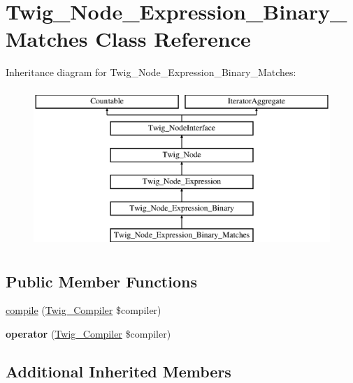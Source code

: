 \hypertarget{class_twig___node___expression___binary___matches}{}\section{Twig\+\_\+\+Node\+\_\+\+Expression\+\_\+\+Binary\+\_\+\+Matches Class Reference}
\label{class_twig___node___expression___binary___matches}
Inheritance diagram for Twig\+\_\+\+Node\+\_\+\+Expression\+\_\+\+Binary\+\_\+\+Matches\+:\begin{figure}[H]
\begin{center}
\leavevmode
\includegraphics[height=6.000000cm]{class_twig___node___expression___binary___matches}
\end{center}
\end{figure}
\subsection*{Public Member Functions}
\begin{DoxyCompactItemize}
\item 
\hyperlink{class_twig___node___expression___binary___matches_a4e0faa87c3fae583620b84d3607085da}{compile} (\hyperlink{class_twig___compiler}{Twig\+\_\+\+Compiler} \$compiler)
\item 
\hypertarget{class_twig___node___expression___binary___matches_af77318ec88d5f8a508684970a150b670}{}{\bfseries operator} (\hyperlink{class_twig___compiler}{Twig\+\_\+\+Compiler} \$compiler)\label{class_twig___node___expression___binary___matches_af77318ec88d5f8a508684970a150b670}

\end{DoxyCompactItemize}
\subsection*{Additional Inherited Members}


